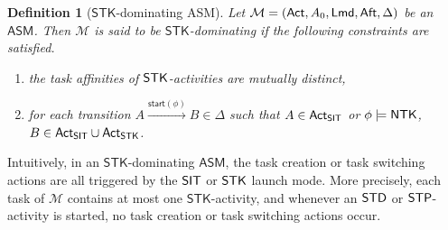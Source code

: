 \documentclass[preprint,12pt]{elsarticle}
\newtheorem{definition}{Definition}
\newcommand\Mm{{\mathcal{M} }}
\newcommand\act{{\sf Act}}
\newcommand\aft{{\sf Aft}}
\newcommand\lmd{{\sf Lmd}}
\newcommand\standard{{\sf STD}}
\newcommand\singletop{{\sf STP}}
\newcommand\singletask{{\sf STK}}
\newcommand\singleinstance{{\sf SIT}}
\newcommand\ntkflag{{\sf NTK}}
\newcommand{\AMASS}{\textsf{ASM}}
\newcommand{\LMAMASS}{\textsf{ASM}_\textsf{LM}}
\newcommand{\IFAMASS}{\textsf{ASM}_\textsf{IF}}
\newcommand\back{{\mathsf{back} }}
\newcommand\startactivity{{\mathsf{start} }}
\newcommand{\STK}{\mathsf{STK}}
\begin{document}
\begin{definition}[$\STK$-dominating \AMASS] \label{def:stk-amass}
Let $\Mm = (\act, A_0, \lmd, \aft, \Delta)$ be an $\AMASS$. Then $\Mm$ is  said to be \emph{$\STK$-dominating} if the following constraints are satisfied.
		\begin{enumerate}
			\item the task affinities of $\singletask$-activities are mutually distinct,
			\item for each transition $A \xrightarrow{\startactivity(\phi)} B\in\Delta$ such that $A \in \act_\singleinstance$ or $\phi\models \ntkflag$, $B \in \act_{\singleinstance} \cup \act_{\singletask}$.
		\end{enumerate}
\end{definition}

Intuitively, in an $\STK$-dominating $\AMASS$, the task creation or task switching actions are all triggered by the $\singleinstance$ or $\singletask$ launch mode. More precisely,  
each task of $\Mm$ contains at most one $\STK$-activity, and  %
whenever an $\standard$ or $\singletop$-activity is started, no task creation or task switching actions occur.  %
\end{document}
